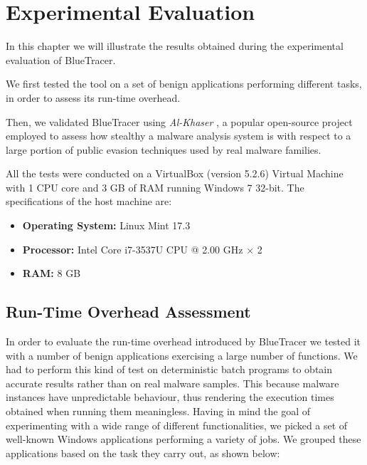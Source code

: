 
\chapter{Experimental Evaluation} \label{results}

In this chapter we will illustrate the results obtained during the experimental evaluation of BlueTracer.

We first tested the tool on a set of benign applications performing different tasks, in order to assess its run-time overhead.

Then, we validated BlueTracer using \textit{Al-Khaser} \cite{AlK}, a popular open-source project employed to assess how stealthy a malware analysis system is with respect to a large portion of public evasion techniques used by real malware families.

\iffalse
Finally, we employed BlueTracer to analyze a group of highly evasive real malware samples collected by Joe Security, the proclaimed technology leader for the analysis of evasive malware.
\fi

\iffalse
If JoeBox added differentiate machines
\fi
All the tests were conducted on a VirtualBox (version 5.2.6)  Virtual Machine with 1 CPU core and 3 GB of RAM running Windows 7 32-bit. The specifications of the host machine are:
\begin{itemize}
\item \textbf{Operating System:} Linux Mint 17.3 
\item \textbf{Processor:} Intel Core i7-3537U CPU @ 2.00 GHz $\times$ 2
\item \textbf{RAM:} 8 GB  
\end{itemize}
 

\section{Run-Time Overhead Assessment}

In order to evaluate the run-time overhead introduced by BlueTracer we tested it with a number of benign applications exercising a large number of functions. We had to perform this kind of test on deterministic batch programs to obtain accurate results rather than on real malware samples. This because malware instances have unpredictable behaviour, thus rendering the execution times obtained when running them meaningless.
Having in mind the goal of experimenting with a wide range of different functionalities, we picked a set of well-known Windows applications performing a variety of jobs. We grouped these applications based on the task they carry out, as shown below:

